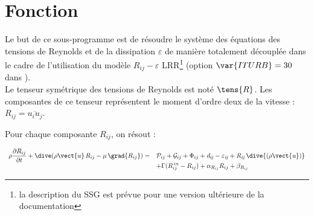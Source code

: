 
%
%
%
%


\label{ap:turrij}

\hypertarget{turrij}{}

\vspace{1cm}
\section*{Fonction}
Le but de ce sous-programme est de r\'esoudre le syst\`eme des \'equations des
tensions de Reynolds et de la dissipation $\varepsilon$ de mani\`ere totalement d\'ecoupl\'ee dans le cadre de l'utilisation du mod\`ele $R_{ij}-\varepsilon$  LRR\footnote{la description du SSG est pr\'evue pour une version ult\'erieure de la documentation} (option $\var{ITURB}=30$ dans ).\\
Le tenseur sym\'etrique des tensions de Reynolds est not\'e $\tens{R}$. Les composantes de ce tenseur repr\'esentent le moment d'ordre deux de la vitesse : $R_{ij} = \overline{u_iu_j}$.

Pour chaque composante $R_{ij}$, on r\'esout :

\begin{equation}
\begin{array}{ll}
\displaystyle
\rho\frac{\partial R_{ij}}{\partial t} +
\dive(\rho \vect{u}\,R_{ij} - \mu\,\grad{R_{ij}}) = &
\mathcal{P}_{ij} + \mathcal{G}_{ij}+\Phi_{ij} + \it{d}_{ij} - \varepsilon_{ij} +
R_{ij}\,\dive{(\rho \vect{u})} \\
& \displaystyle + \Gamma(R^{\,in}_{ij}-R_{ij}) + \alpha_{R_{ij}} R_{ij} + \beta_{R_{ij}}
\end{array}
\end{equation}

